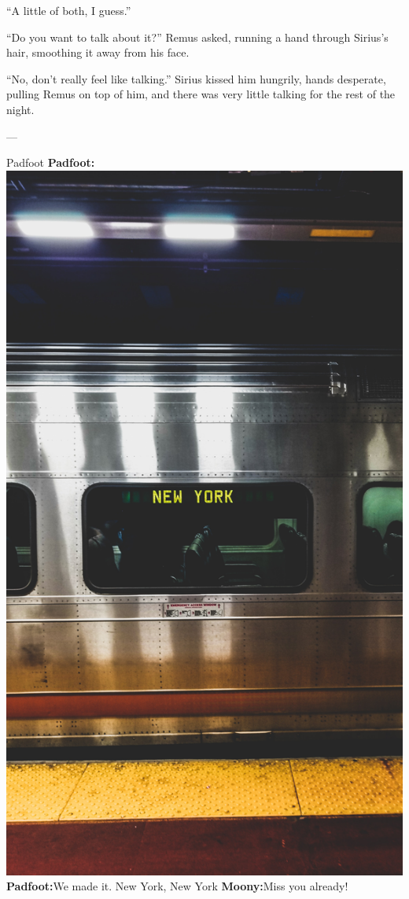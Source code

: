 \documentclass[12pt,twoside,openright]{memoir}
\begin{document}
``A little of both, I guess.'' 

``Do you want to talk about it?'' Remus asked, running a hand through Sirius's hair, smoothing it away from his face.

``No, don't really feel like talking.'' Sirius kissed him hungrily, hands desperate, pulling Remus on top of him, and there was very little talking for the rest of the night. 

---

Padfoot\newline
\textbf{Padfoot:} {\centering\includegraphics[width=\textwidth]{ivan-mani-bRv5vZcbAa4-unsplash}}
\newline
\textbf{Padfoot:}We made it. New York, New York\newline
\textbf{Moony:}Miss you already! 
\end{document}

